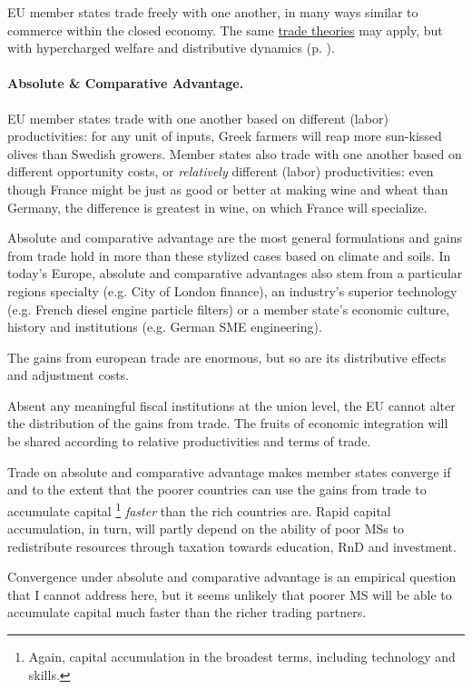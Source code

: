 \documentclass[11pt,a4paper,oneside,openright]{article}
\begin{document}
\gls{EU} member states trade freely with one another, in many ways similar to commerce within the closed economy. 
The same \hyperref[sec:space]{trade theories} may apply, but with hypercharged welfare and distributive dynamics (p. \pageref{sec:space}). 
		
\paragraph{Absolute \& Comparative Advantage.} 
\gls{EU} member states trade with one another based on different (labor) productivities: 
for any unit of inputs, Greek farmers will reap more sun-kissed olives than Swedish growers. 
Member states also trade with one another based on different opportunity costs, or \emph{relatively} different (labor) productivities: 
even though France might be just as good or better at making wine and wheat than Germany, the difference is greatest in wine, on which France will specialize. 

Absolute and comparative advantage are the most general formulations and gains from trade hold in more than these stylized cases based on climate and soils. 
In today's Europe, absolute and comparative advantages also stem from a particular regions specialty (e.g. City of London finance), an industry's superior technology (e.g. French diesel engine particle filters) or a member state's economic culture, history and institutions (e.g. German \gls{SME} engineering).

The gains from european trade are enormous, but so are its distributive effects and adjustment costs. 

Absent any meaningful fiscal institutions at the union level, the \gls{EU} cannot alter the distribution of the gains from trade. 
The fruits of economic integration will be shared according to relative productivities and terms of trade.

Trade on absolute and comparative advantage makes member states converge if and to the extent that the poorer countries can use the gains from trade to accumulate capital
	\footnote{
		Again, capital accumulation in the broadest terms, including technology and skills.
	}
\emph{faster} than the rich countries are. 
Rapid capital accumulation, in turn, will partly depend on the ability of poor \glspl{MS} to redistribute resources through taxation towards education, \gls{RnD} and investment.

Convergence under absolute and comparative advantage is an empirical question that I cannot address here, but it seems unlikely that poorer \gls{MS} will be able to accumulate capital much faster than the richer trading partners. 
\end{document}
